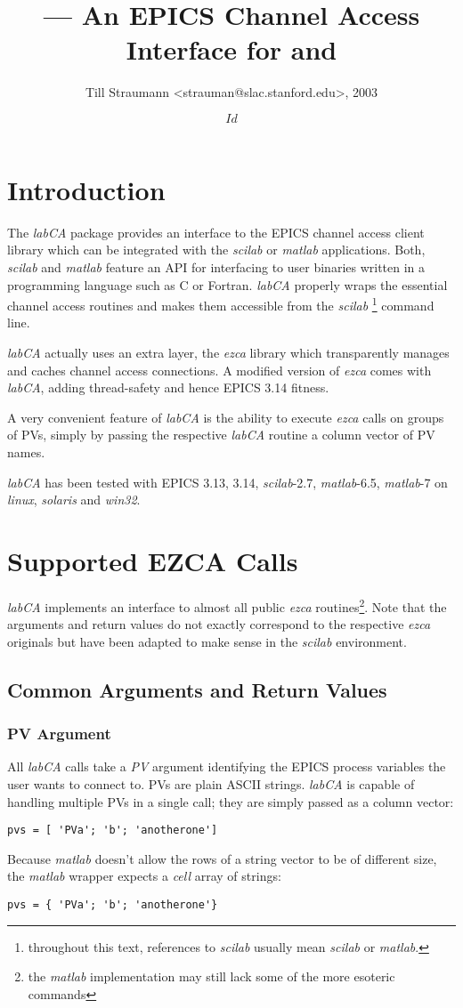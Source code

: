 \documentclass{article}
\title{\sca{} --- An EPICS Channel Access Interface for \scilab{} and \matlab{}}
\author{Till Straumann <strauman@slac.stanford.edu>, 2003}
\date{$Id$}
\newcommand{\sca}{{\em labCA}}
\newcommand{\scilab}{{\em scilab}}
\newcommand{\matlab}{{\em matlab}}
\newcommand{\windoze}{{\em win32}}
\newcommand{\ezca}{{\em ezca}}
\begin{document}
\maketitle
\section{Introduction}
The \sca{} package provides an interface to the
EPICS channel access client library which can be
integrated with the \scilab{} or \matlab{} applications.
Both, \scilab{} and \matlab{} feature an API for interfacing
to user binaries written in a programming language such
as C or Fortran. \sca{} properly wraps the essential
channel access routines and makes them accessible
from the \scilab%
\footnote{throughout this text, references to \scilab{}
usually mean \scilab{} or \matlab.}
command line.

\sca{} actually uses an extra layer, the \ezca{} library
which transparently manages and caches channel access 
connections. A modified version of \ezca{} comes with
\sca, adding thread-safety and hence EPICS 3.14 fitness.

A very convenient feature of \sca{} is the ability
to execute \ezca{} calls on groups of PVs, simply by
passing the respective \sca{} routine a column vector
of PV names.

\sca{} has been tested with EPICS 3.13, 3.14, \scilab-2.7,
\matlab-6.5, \matlab-7 on {\em linux}, {\em solaris} and
\windoze.

\section{Supported EZCA Calls}
\sca{} implements an interface to almost all public
\ezca{} routines\footnote{%
the \matlab{} implementation may still lack some of the
more esoteric commands}. Note that the arguments and
return values do not exactly correspond to the respective
\ezca{} originals but have been adapted to make sense
in the  \scilab{} environment.

\subsection{Common Arguments and Return Values}
\subsubsection{PV Argument}
All \sca{} calls take a {\em PV} argument identifying
the EPICS process variables the user wants to connect to.
PVs are plain ASCII strings. \sca{} is capable of handling
multiple PVs in a single call; they are simply passed as a
column vector:
\begin{verbatim}
pvs = [ 'PVa'; 'b'; 'anotherone']
\end{verbatim}
Because \matlab{} doesn't allow the rows of
a string vector to be of different size, the \matlab{}
wrapper expects a {\em cell} array of strings:
\begin{verbatim}
pvs = { 'PVa'; 'b'; 'anotherone'}
\end{verbatim}
\end{document}

